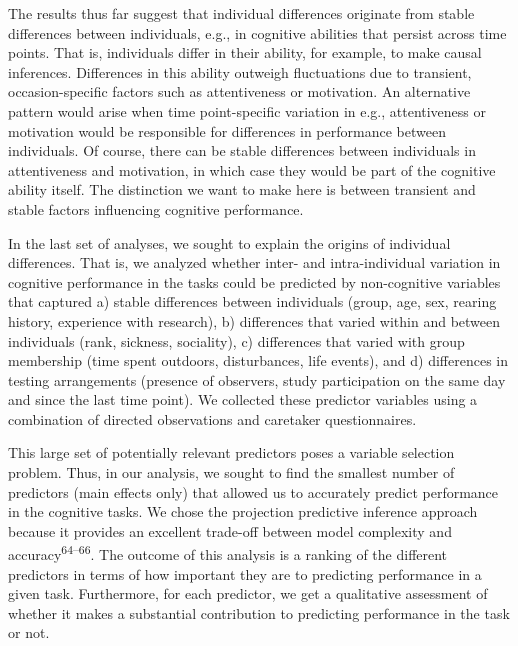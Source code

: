 \documentclass[
  man,floatsintext]{apa6}
\begin{document}
The results thus far suggest that individual differences originate from stable differences between individuals, e.g., in cognitive abilities that persist across time points. That is, individuals differ in their ability, for example, to make causal inferences. Differences in this ability outweigh fluctuations due to transient, occasion-specific factors such as attentiveness or motivation. An alternative pattern would arise when time point-specific variation in e.g., attentiveness or motivation would be responsible for differences in performance between individuals. Of course, there can be stable differences between individuals in attentiveness and motivation, in which case they would be part of the cognitive ability itself. The distinction we want to make here is between transient and stable factors influencing cognitive performance.

In the last set of analyses, we sought to explain the origins of individual differences. That is, we analyzed whether inter- and intra-individual variation in cognitive performance in the tasks could be predicted by non-cognitive variables that captured a) stable differences between individuals (group, age, sex, rearing history, experience with research), b) differences that varied within and between individuals (rank, sickness, sociality), c) differences that varied with group membership (time spent outdoors, disturbances, life events), and d) differences in testing arrangements (presence of observers, study participation on the same day and since the last time point). We collected these predictor variables using a combination of directed observations and caretaker questionnaires.

This large set of potentially relevant predictors poses a variable selection problem. Thus, in our analysis, we sought to find the smallest number of predictors (main effects only) that allowed us to accurately predict performance in the cognitive tasks. We chose the projection predictive inference approach because it provides an excellent trade-off between model complexity and accuracy\textsuperscript{64--66}. The outcome of this analysis is a ranking of the different predictors in terms of how important they are to predicting performance in a given task. Furthermore, for each predictor, we get a qualitative assessment of whether it makes a substantial contribution to predicting performance in the task or not.
\end{document}
